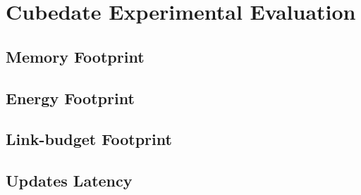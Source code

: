 \section{Cubedate Experimental Evaluation}
\label{sec:evaluation}

\subsection{Memory Footprint}
\subsection{Energy Footprint}
\subsection{Link-budget Footprint}
\subsection{Updates Latency}

